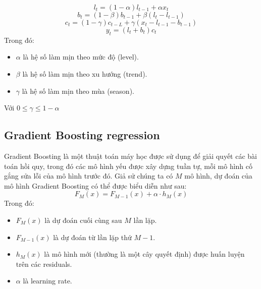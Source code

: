 \documentclass[conference]{IEEEtran}
\begin{document}
\[
l_{t} = (1 - \alpha)l_{t - 1} + \alpha x_{t}
\]
\[
b_{t} = (1 - \beta)b_{t - 1} + \beta (l_{t} - l_{t - 1})
\]
\[
c_{t} = (1 - \gamma)c_{t - L} + \gamma (x_{t} - l_{t - 1} - b_{t - 1})
\]
\[
y_{t} = (l_{t} + b_{t})c_{t}
\]
Trong đó:
\begin{itemize}
    \item \(\alpha\) là hệ số làm mịn theo mức độ (level).
    \item \(\beta\) là hệ số làm mịn theo xu hướng (trend).
    \item \(\gamma\) là hệ số làm mịn theo mùa (season).
\end{itemize}
Với \(0 \leq \gamma \leq 1-\alpha\)

\subsection{Gradient Boosting regression}
Gradient Boosting là một thuật toán máy học được sử dụng để giải quyết các bài toán hồi quy, trong đó các mô hình yếu được xây dựng tuần tự, mỗi mô hình cố gắng sửa lỗi của mô hình trước đó. 
Giả sử chúng ta có $M$ mô hình, dự đoán của mô hình Gradient Boosting có thể được biểu diễn như sau:
\[
F_M(x) = F_{M-1}(x) + \alpha \cdot h_M(x)
\]
Trong đó:
\begin{itemize}
    \item $F_M(x)$ là dự đoán cuối cùng sau $M$ lần lặp.
    \item $F_{M-1}(x)$ là dự đoán từ lần lặp thứ $M-1$.
    \item $h_M(x)$ là mô hình mới (thường là một cây quyết định) được huấn luyện trên các residuals.
    \item $\alpha$ là learning rate.
\end{itemize}
\end{document}
